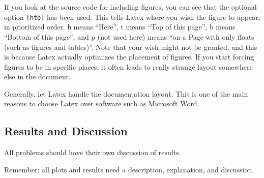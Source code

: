 If you look at the source code for including figures, you can see that the optional option \verb+[htb]+ has been used. This tells Latex where you wish the figure to appear, in prioritized order. \verb+h+ means ``Here'', t means ``Top of this page'', b means ``Bottom of this page'', and p (not used here) means ``on a Page with only floats (such as figures and tables)''. Note that your wish might not be granted, and this is because Latex actually optimizes the placement of figures. If you start forcing figures to be in specific places, it often leads to really strange layout somewhere else in the document. 

Generally, let Latex handle the documentation layout. This is one of the main reasons to choose Latex over software such as Microsoft Word.

\subsection{Results and Discussion}
All problems should have their own discussion of results. 

Remember: all plots and results need a description, explanation, and discussion.
